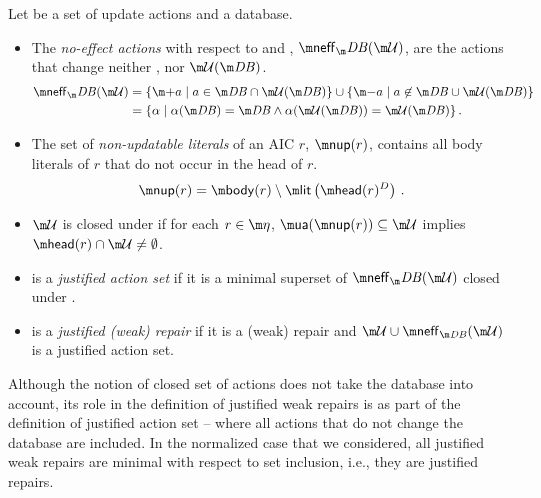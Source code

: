 \begin{definition}
  Let \UU be a set of update actions and \fulldb a database. 
  \begin{itemize}
   \item The \emph{no-effect actions} with respect to \db and \UU, $\neff_\db(\UU)$, are the actions that change neither \db, nor $\UU(\db)$.
     \begin{align*}\neff_\db(\UU) &= \{\add a\mid a \in \db \cap \UU(\db)\} \cup \{\remove a \mid a \not\in \db \cup \UU(\db)\}\\
       &=\{\alpha \mid \alpha(\db) = \db \land \alpha(\UU(\db))=\UU(\db)\}\,.
     \end{align*}
   \item The set of \emph{non-updatable literals} of an AIC $r$, $\nup(r)$, contains all body literals of $r$ that do not occur in the head of $r$.
     \[\nup(r) = \body(r) \setminus \litof\left(\head(r)^D\right)\,.\]
   \item $\UU$ is closed under \aics if for each $r\in \aics$, $\actof(\nup(r))\subseteq \UU$ implies $\head(r)\cap \UU\neq \emptyset$.
   \item \UU is a \emph{justified action set} if it is a minimal superset of $\neff_\db(\UU)$ closed under \aics.
   \item \UU is a \emph{justified (weak) repair} if it is a (weak) repair and $\UU\cup \neff_{\db}(\UU)$ is a justified action set. 
  \end{itemize}

\end{definition}
Although the notion of closed set of actions does not take the database into account, its role in the definition of justified weak repairs is as part of the definition of justified action set -- where all actions that do not change the database are included.
In the normalized case that we considered, all justified weak repairs are minimal with respect to set inclusion, i.e., they are justified repairs.

